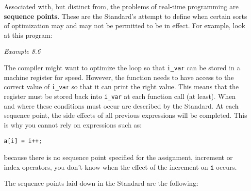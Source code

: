   

  Associated with, but distinct from, the problems of real-time
   programming are \textbf{sequence points}. These are the Standard's
   attempt to define when certain sorts of optimization may and may not be
   permitted to be in effect. For example, look at this program:


  \begin{center}\textit{Example 8.6}\end{center}


  The compiler might want to optimize the loop so that \texttt{i\_var}
   can be stored in a machine register for speed. However, the function
   needs to have access to the correct value of \texttt{i\_var} so that
   it can print the right value. This means that the register must be stored
   back into \texttt{i\_var} at each function call (at least).  When and
   where these conditions must occur are described by the Standard. At each
   sequence point, the side effects of all previous expressions will be
   completed. This is why you cannot rely on expressions such as:


  \begin{Verbatim}
a[i] = i++;
\end{Verbatim}

  because there is no sequence point specified for the assignment,
   increment or index operators, you don't know when the effect of the
   increment on \texttt{i} occurs.


  The sequence points laid down in the Standard are the following:


